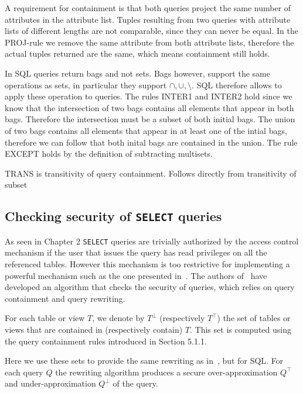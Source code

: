 A requirement for containment is that both queries project the same number of attributes in the attribute list. 
%
Tuples resulting from two queries with attribute lists of different lengths are not comparable, since they can never be equal.
%
In the PROJ-rule we remove the same attribute from both attribute lists, therefore the actual tuples returned are the same, which means containment still holds.

In SQL queries return bags and not sets.
%
Bags however, support the same operations as sets, in particular they support $\cap, \cup, \setminus$. 
%
SQL therefore allows to apply these operation to queries.
%
The rules INTER1 and INTER2 hold  since we know that the intersection of two bags contains all elements that appear in both bags.
%
Therefore the intersection must be a subset of both initial bags.
%
The union of two bags contains all elements that appear in at least one of the intial  bags, therefore we can follow that both inital  bags are contained in the union.
%
The rule EXCEPT holds by the definition of subtracting multisets. 

TRANS is transitivity of query containment. Follows directly from transitivity of subset 

\FloatBarrier
\subsection{Checking security of \texttt{SELECT} queries}

As seen in Chapter 2 \texttt{SELECT} queries are trivially authorized by the access control mechanism if the user that issues the query has read privileges on all the referenced tables.
%
However this mechanism is too restrictive for implementing a powerful mechanism such as the one presented in~\cite{guarnieri2016strong}.
%
The authors of~\cite{guarnieri2016strong} have developed an algorithm that checks the security of queries, which relies on query containment and query rewriting. 

For each table or view $T$, we denote by $T^\bot$ (respectively $T^\top$) the set of tables or views that are contained in (respectively contain) $T$.
%
This set is computed using the query containment rules introduced in Section 5.1.1.
%

Here we use these sets to provide the same rewriting as in~\cite{guarnieri2016strong}, but for SQL. 
%
For each query $Q$ the rewriting algorithm produces a secure over-approximation $Q^\top$ and under-approximation $Q^\bot$ of the query.


